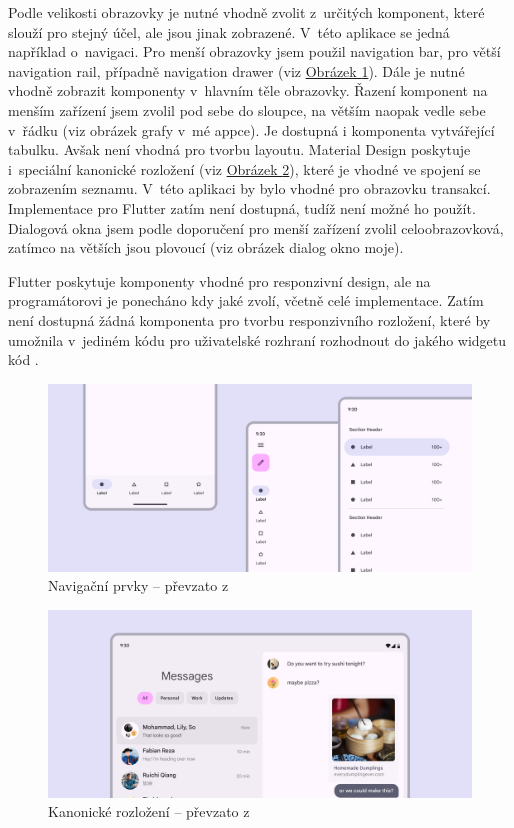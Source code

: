 \documentclass[
  biblatex,
  figures=true,
  tables=false,
  glossaries,
  index
]{kidiplom}
\begin{document}
Podle velikosti obrazovky je nutné vhodně zvolit z~určitých komponent, které slouží pro stejný účel, ale jsou jinak zobrazené. V~této aplikace se jedná například o~navigaci. Pro menší obrazovky jsem použil navigation bar, pro větší navigation rail, případně navigation drawer (viz \hyperref[fig:navigation]{Obrázek \ref{fig:navigation}}). Dále je nutné vhodně zobrazit komponenty v~hlavním těle obrazovky. Řazení komponent na menším zařízení jsem zvolil pod sebe do sloupce, na větším naopak vedle sebe v~řádku (viz obrázek grafy v~mé appce). Je dostupná i komponenta  vytvářející tabulku. Avšak není vhodná pro tvorbu layoutu. Material Design poskytuje i~speciální kanonické rozložení (viz \hyperref[fig:canonical-layout]{Obrázek \ref{fig:canonical-layout}}), které je vhodné ve spojení se zobrazením seznamu. V~této aplikaci by bylo vhodné pro obrazovku transakcí. Implementace pro Flutter zatím není dostupná, tudíž není možné ho použít. Dialogová okna jsem podle doporučení pro menší zařízení zvolil celoobrazovková, zatímco na větších jsou plovoucí (viz obrázek dialog okno moje).

Flutter poskytuje komponenty vhodné pro responzivní design, ale na programátorovi je ponecháno kdy jaké zvolí, včetně celé implementace. Zatím není dostupná žádná komponenta pro tvorbu responzivního rozložení, které by umožnila v~jediném kódu pro uživatelské rozhraní rozhodnout do jakého widgetu kód .

\begin{figure}
  \centering 
  \includegraphics[width=\textwidth]{images/navigation1.png}
  \caption{Navigační prvky -- převzato z~\cite{layout-m3}}
  \label{fig:navigation}
\end{figure}

\begin{figure}
  \centering 
  \includegraphics[width=\textwidth]{images/canonical-layout.png}
  \caption{Kanonické rozložení -- převzato z~\cite{m3}}
  \label{fig:canonical-layout}
\end{figure}
\end{document}
